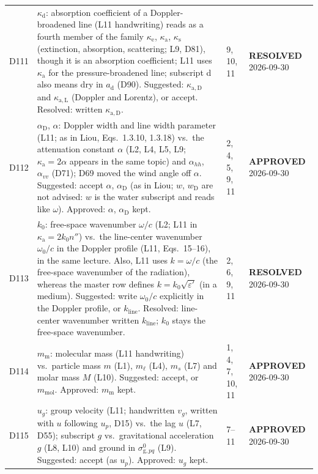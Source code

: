 \documentclass[11pt, oneside]{article}
\newcommand{\approved}{\textbf{APPROVED}}
\newcommand{\resolved}{\textbf{RESOLVED}}
\begin{document}
\begin{longtable}{l >{\raggedright\arraybackslash}p{} l l}
D111 & $\kappa_\mathrm{d}$: absorption coefficient of a Doppler-broadened line (L11 handwriting) reads as a fourth member of the family $\kappa_\mathrm{e}$, $\kappa_\mathrm{a}$, $\kappa_\mathrm{s}$ (extinction, absorption, scattering; L9, D81), though it is an absorption coefficient; L11 uses $\kappa_\mathrm{a}$ for the pressure-broadened line; subscript d also means dry in $a_\mathrm{d}$ (D90). Suggested: $\kappa_{\mathrm{a},\mathrm{D}}$ and $\kappa_{\mathrm{a},\mathrm{L}}$ (Doppler and Lorentz), or accept. Resolved: written $\kappa_{\mathrm{a},\mathrm{D}}$. & 9, 10, 11 & \resolved{} 2026-09-30 \\
D112 & $\alpha_\mathrm{D}$, $\alpha$: Doppler width and line width parameter (L11; as in Liou, Eqs.~1.3.10, 1.3.18) vs.\ the attenuation constant $\alpha$ (L2, L4, L5, L9; $\kappa_\mathrm{a} = 2\alpha$ appears in the same topic) and $\alpha_{hh}$, $\alpha_{vv}$ (D71); D69 moved the wind angle off $\alpha$. Suggested: accept $\alpha$, $\alpha_\mathrm{D}$ (as in Liou; $w$, $w_\mathrm{D}$ are not advised: $w$ is the water subscript and reads like $\omega$). Approved: $\alpha$, $\alpha_\mathrm{D}$ kept. & 2, 4, 5, 9, 11 & \approved{} 2026-09-30 \\
D113 & $k_0$: free-space wavenumber $\omega/c$ (L2; L11 in $\kappa_\mathrm{a} = 2k_0n''$) vs.\ the line-center wavenumber $\omega_0/c$ in the Doppler profile (L11, Eqs.~15--16), in the same lecture. Also, L11 uses $k = \omega/c$ (the free-space wavenumber of the radiation), whereas the master row defines $k = k_0\sqrt{\varepsilon'}$ (in a medium). Suggested: write $\omega_0/c$ explicitly in the Doppler profile, or $k_\mathrm{line}$. Resolved: line-center wavenumber written $k_\mathrm{line}$; $k_0$ stays the free-space wavenumber. & 2, 6, 9, 11 & \resolved{} 2026-09-30 \\
D114 & $m_\mathrm{m}$: molecular mass (L11 handwriting) vs.\ particle mass $m$ (L1), $m_\ell$ (L4), $m_s$ (L7) and molar mass $M$ (L10). Suggested: accept, or $m_\mathrm{mol}$. Approved: $m_\mathrm{m}$ kept. & 1, 4, 7, 10, 11 & \approved{} 2026-09-30 \\
D115 & $u_g$: group velocity (L11; handwritten $v_g$, written with $u$ following $u_p$, D15) vs.\ the lag $u$ (L7, D55); subscript $g$ vs.\ gravitational acceleration $g$ (L8, L10) and ground in $\sigma^0_{\mathrm{g},pq}$ (L9). Suggested: accept (as $u_p$). Approved: $u_g$ kept. & 7--11 & \approved{} 2026-09-30 \\

\end{longtable}
\end{document}
